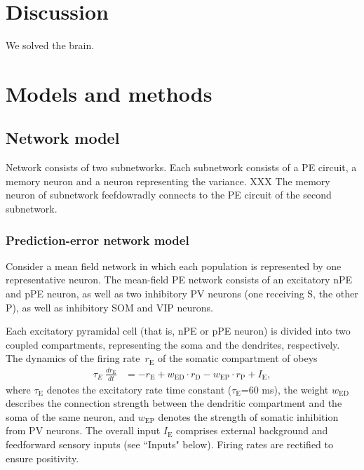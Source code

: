 \documentclass[10pt,a4paper,draft]{article}
\begin{document}
\section*{Discussion}

We solved the brain.


\section*{Models and methods}
%

\subsection*{Network model}
%
Network consists of two subnetworks. Each subnetwork consists of a PE circuit, a memory neuron and a neuron representing the variance. XXX The memory neuron of subnetwork feefdowradly connects to the PE circuit of the second subnetwork.

\subsubsection*{Prediction-error network model}
%
Consider a mean field network in which each population is represented by one representative neuron. The mean-field PE network consists of an excitatory nPE and pPE neuron, as well as two inhibitory PV neurons (one receiving S, the other P), as well as inhibitory SOM and VIP neurons.

Each excitatory pyramidal cell (that is, nPE or pPE neuron) is divided into two coupled compartments, representing the soma and the dendrites, respectively. The dynamics of the firing rate~$r_{\mathrm{E}}$ of the somatic compartment of obeys \citep{wilson1972excitatory}
%
\begin{align}
\tau_E\ \frac{dr_\mathrm{E}}{dt} &= - r_\mathrm{E} + w_\mathrm{ED}\cdot  r_\mathrm{D}  -  w_\mathrm{EP}\cdot r_\mathrm{P} + I_\mathrm{E},
\end{align}
%
where $\tau_\mathrm{E}$ denotes the excitatory rate time constant ($\tau_\mathrm{E}$=60 ms), the weight $w_{\mathrm{ED}}$ describes the connection strength between the dendritic compartment and the soma of the same neuron, and $w_{\mathrm{EP}}$ denotes the strength of somatic inhibition from PV neurons. The overall input $I_\mathrm{E}$ comprises external background and feedforward sensory  inputs (see ``Inputs" below). Firing rates are rectified to ensure positivity.
\end{document}
